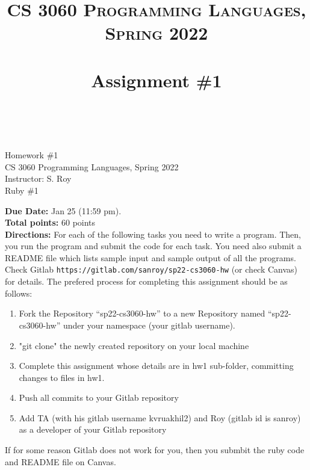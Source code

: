 \documentclass[paper=letter, fontsize=11pt]{scrartcl} %
\title{ 
    \normalfont \normalsize 
    \textsc{CS 3060 Programming Languages, Spring 2022} \\ [25pt] %
    \horrule{0.5pt} \\[0.4cm] %
    \huge Assignment \#1  \\ %
    \horrule{2pt} \\[0.5cm] %
}
\begin{document}
    \begin{center}
         Homework \#1\\
        \small CS 3060 Programming Languages, Spring 2022 \\
        \small Instructor: S. Roy \\
        \huge Ruby \#1
    \end{center}
    
    \textbf{Due Date:}  Jan 25 (11:59 pm).\\

    \textbf{Total points:} 60 points \\

    \textbf{Directions:} For each of the following tasks you need to write a program. 
Then, you run the program and submit the code for each task. You need also submit a README file 
which lists sample input and sample output of all the programs. 
Check Gitlab \@ \texttt{https://gitlab.com/sanroy/sp22-cs3060-hw} (or check Canvas) for details. 
The prefered process for completing this assignment should be as follows:

    \begin{enumerate}[noitemsep]
        \item Fork the Repository ``sp22-cs3060-hw'' to a new Repository named ``sp22-cs3060-hw'' 
under your namespace (your gitlab username).
        \item "git clone" the newly created repository on your local machine
        \item Complete this assignment whose details are in hw1 sub-folder, committing changes to files in hw1. 
        \item Push all commits to your Gitlab repository
        \item Add TA (with his gitlab username kvruakhil2) and Roy (gitlab id is sanroy) as a developer of your Gitlab repository
    \end{enumerate}

If for some reason Gitlab does not work for you, then you submbit the ruby code and README file on Canvas.
\end{document}
